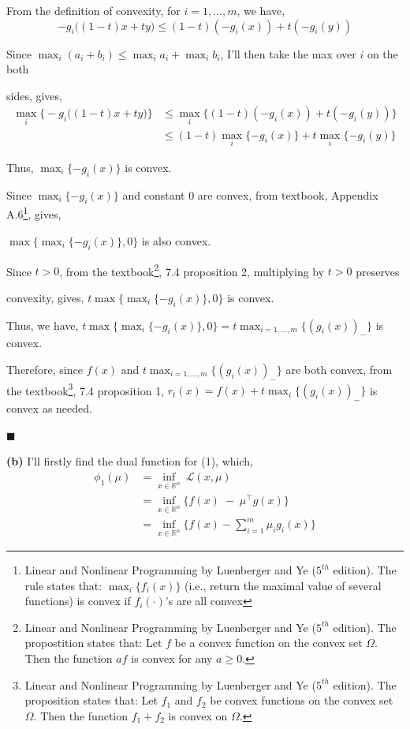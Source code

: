 \documentclass[12pt]{article}
\begin{document}
\quad \qquad From the definition of convexity, for $i=1,\dots,m$, we have,
$$
-g_i\bigl((1-t)x+t y\bigr) \le (1-t)(-g_i(x)) + t(-g_i(y))
$$

\quad \qquad Since $\max_i(a_i+b_i)\le \max_i a_i+\max_i b_i$, I'll then take the max over $i$ on the both 

\quad \qquad sides, 
gives,
\begin{align*}
	\max_{i}\bigl\{-g_i\bigl((1-t)x+t y\bigr)\bigr\} &\le \max_i\bigl\{(1-t)(-g_i(x))+t(-g_i(y))\bigr\} \\
	&\le (1-t)\max_i\{-g_i(x)\} + t\max_i\{-g_i(y)\}
\end{align*}

\quad \qquad Thus, $\max_{i}\{-g_i(x)\}$ is convex.

\quad Since $\max_{i}\{-g_i(x)\}$ and constant 0 are convex, from textbook, Appendix A.6\footnote{Linear and Nonlinear Programming by Luenberger and Ye ($5^{th}$ edition). The rule states that: $\max_i \{ f_i(x) \}$ (i.e., return the maximal value of several functions) is convex if $f_i(\cdot)$'s are all convex}, gives, 

\quad $\max\bigl\{\max_{i}\{-g_i(x)\}, 0\bigr\}$ is also convex.

\quad Since $t>0$, from the textbook\footnote{Linear and Nonlinear Programming by Luenberger and Ye ($5^{th}$ edition). The propostition states that: Let $f$ be a convex function on the convex set $\Omega$. Then the function $a f$ is convex for any $a \ge 0$.}, 7.4 proposition 2, multiplying by $t>0$ preserves 

\quad convexity, gives, $t\max\bigl\{\max_{i}\{-g_i(x)\}, 0\bigr\}$ is convex. 

\quad Thus, we have, 
$
t\max\bigl\{\max_{i}\{-g_i(x)\}, 0\bigr\}= t\max_{i=1,\dots,m}\{(g_i(x))_-\}
$
is convex.

Therefore, since $f(x)$ and $t\max_{i=1,\dots,m}\{(g_i(x))_-\}$ are both convex, from the textbook\footnote{Linear and Nonlinear Programming by Luenberger and Ye ($5^{th}$ edition). The proposition states that: Let $f_1$ and $f_2$ be convex functions on the convex set $\Omega$. Then the function $f_1+f_2$ is convex on $\Omega$.}, 7.4 proposition 1, $r_t(x)=f(x)+t\max_{i}\{(g_i(x))_-\}$ is convex as needed. 

\hfill $\blacksquare$

\vspace{10pt}
\noindent
\textbf{(b)} 
I'll firstly find the dual function for (1), which, 
\begin{align*}
	\phi_1(\mu) &= \inf_{x\in\mathbb R^n}\ \mathcal L(x,\mu) \\
	&= \inf_{x\in\mathbb R^n}\bigl\{f(x)\;-\;\mu^\top g(x)\bigr\} \\
	&= \inf_{x\in\mathbb R^n}\bigl\{f(x)-\sum_{i=1}^m \mu_i g_i(x)\bigr\}
\end{align*}
\end{document}
